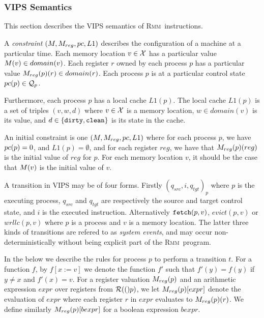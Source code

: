 \documentclass[a4paper]{article}
\newcommand{\rmm}{\textsc{Rmm}}
\begin{document}
\subsubsection{VIPS Semantics}\label{sec:rmm:vips}

\newcommand{\lone}{L1}
\newcommand{\dirty}{{\tt dirty}}
\newcommand{\clean}{{\tt clean}}
\newcommand{\fetch}{{\tt fetch}}
\newcommand{\evict}{{\tt evict}}
\newcommand{\wrllc}{{\tt wrllc}}
\newcommand{\fence}{{\tt fence}}
\newcommand{\syncrwrite}{{\tt syncwr}}
\newcommand{\inlone}[2]{#2{\tt .has}(#1)}
\newcommand{\notinlone}[2]{\neg #2{\tt .has}(#1)}
\newcommand{\lonerem}[2]{#1 \obslash #2}
\newcommand{\lonevalof}[2]{#1(#2){.\tt val}}
\newcommand{\lonemodof}[2]{#1(#2){.\tt mod}}
\newcommand{\theunique}{The\hspace{2pt}}


This section describes the VIPS semantics of \rmm\ instructions.

A {\em constraint} $(\mem,\regval,\pc,\lone)$ describes the
configuration of a machine at a particular time. Each memory location
$v\in\mathcal{X}$ has a particular value $M(v)\in domain(v)$. Each
register $r$ owned by each process $p$ has a particular value
$M_{reg}(p)(r)\in domain(r)$. Each process $p$ is at a particular
control state $pc(p)\in\mathcal{Q}_{p}$.

Furthermore, each process $p$ has a local cache $\lone(p)$. The local
cache $\lone(p)$ is a set of triples $(v,w,d)$ where $v\in\mathcal{X}$ is a
memory location, $w\in domain(v)$ is its value, and
$d\in\{\dirty,\clean\}$ is its state in the cache.

An initial constraint is one $(\mem,\regval,\pc,\lone)$ where for each
process $p$, we have $pc(p) = 0$, and $\lone(p) = \emptyset$, and for
each register $reg$, we have that $M_{reg}(p)(reg)$ is the initial
value of $reg$ for $p$. For each memory location $v$, it should be the
case that $M(v)$ is the initial value of $v$.

A transition in VIPS may be of four forms. Firstly
$(q_{src},i,q_{tgt})_p$ where $p$ is the executing process, $q_{src}$
and $q_{tgt}$ are respectively the source and target control state,
and $i$ is the executed instruction. Alternatively $\fetch(p,v)$,
$evict(p,v)$ or $wrllc(p,v)$ where $p$ is a process and $v$ is a
memory location. The latter three kinds of transitions are refered to
as {\em system events}, and may occur non-deterministically without
being explicit part of the \rmm\ program.

In the below we describe the rules for process $p$ to perform a
transition $t$. For a function $f$, by $f[x:=v]$ we denote the
function $f'$ such that $f'(y) = f(y)$ if $y \neq x$ and $f'(x) =
v$. For a register valuation $M_{reg}(p)$ and an arithmetic expression
$expr$ over registers from $\mathcal{R}(()p)$, we let $M_{reg}(p)[expr]$
denote the evaluation of $expr$ where each register $r$ in $expr$
evaluates to $M_{reg}(p)(r)$. We define similarly $M_{reg}(p)[bexpr]$
for a boolean expression $bexpr$.
\end{document}

